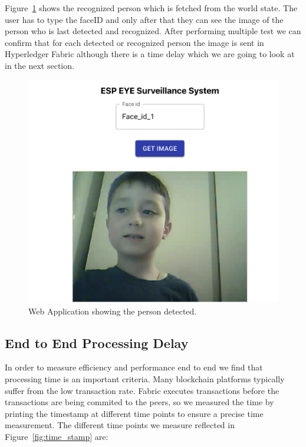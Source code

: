 Figure~\ref{fig:junes} shows the recognized person which is fetched from the world state. The user has to type the faceID and only after that they can see the image of the person who is last detected and recognized. After performing multiple test we can confirm that for each detected or recognized person the image is sent in Hyperledger Fabric although there is a time delay which we are going to look at in the next section. 
\begin{figure}[!htb]
    \centering
    \includegraphics[width=1\textwidth]{figures/junes1.png}
    \caption{Web Application showing the person detected.}
    \label{fig:junes}
\end{figure}


\subsection{End to End Processing Delay}

In order to measure efficiency and performance  end to end we find that processing time is an important criteria. Many blockchain platforms typically suffer from the low transaction rate. Fabric executes transactions before the transactions are being commited to the peers, so we measured the time by printing the timestamp at different time points to ensure a precise time measurement. 
The different time points we measure reflected in Figure~\ref{fig:time_stamp} are: 


